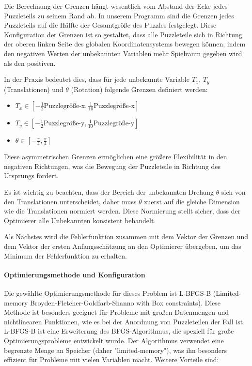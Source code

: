 Die Berechnung der Grenzen hängt wesentlich vom Abstand der Ecke jedes  Puzzleteils zu seinem Rand ab. In unserem Programm sind die Grenzen jedes Puzzleteils auf die Hälfte der Gesamtgröße des Puzzles festgelegt. Diese Konfiguration der Grenzen ist so gestaltet, dass alle Puzzleteile sich in Richtung der oberen linken Seite des globalen Koordinatensystems bewegen können, indem den negativen Werten der unbekannten Variablen mehr Spielraum gegeben wird als den positiven. 

In der Praxis bedeutet dies, dass für jede unbekannte Variable $T_x$, $T_y$ (Translationen) und $\theta$ (Rotation) folgende Grenzen definiert werden:
\begin{itemize}
    \item $T_x \in [-\frac{1}{2} \text{Puzzlegröße-x}, \frac{1}{10} \text{Puzzlegröße-x}]$
    \item $T_y \in [-\frac{1}{2} \text{Puzzlegröße-y}, \frac{1}{10} \text{Puzzlegröße-y}]$
    \item $\theta \in [-\frac{\pi}{4}, \frac{\pi}{4}]$
\end{itemize}

Diese asymmetrischen Grenzen ermöglichen eine größere Flexibilität in den negativen Richtungen, was die Bewegung der Puzzleteile in Richtung des Ursprungs fördert.

Es ist wichtig zu beachten, dass der Bereich der unbekannten Drehung $\theta$ sich von den Translationen unterscheidet, daher muss $\theta$ zuerst auf die gleiche Dimension wie die Translationen normiert werden. Diese Normierung stellt sicher, dass der Optimierer alle Unbekannten konsistent behandelt.

Als Nächstes wird die Fehlerfunktion zusammen mit dem Vektor der Grenzen und dem Vektor der ersten Anfangsschätzung an den Optimierer übergeben, um das Minimum der Fehlerfunktion zu erhalten.

\paragraph{Optimierungsmethode und Konfiguration}
Die gewählte Optimierungsmethode für dieses Problem ist L-BFGS-B (Limited-memory Broyden-Fletcher-Goldfarb-Shanno with Box constraints). Diese Methode ist besonders geeignet für Probleme mit großen Datenmengen und nichtlinearen Funktionen, wie es bei der Anordnung von Puzzleteilen der Fall ist. L-BFGS-B ist eine Erweiterung des BFGS-Algorithmus, die speziell für große Optimierungsprobleme entwickelt wurde. Der Algorithmus verwendet eine begrenzte Menge an Speicher (daher "limited-memory"), was ihn besonders effizient für Probleme mit vielen Variablen macht. Weitere Vorteile sind:

